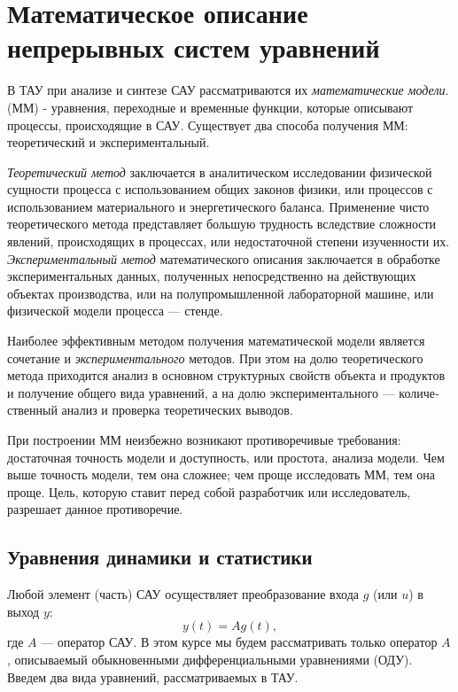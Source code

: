 \documentclass[TAU.tex]{subfiles}
\begin{document}
\chapter{Математическое описание непрерывных систем уравнений} %

В ТАУ при анализе и синтезе САУ рассматриваются их {\it математические модели}.
 (ММ) - уравнения, переходные и временные функции, которые описывают процессы, происходящие в САУ.
Существует два способа получения ММ: теоретический и экспериментальный.\par
{\it Теоретический метод} заключается в аналитическом исследовании физической сущности процесса с использованием общих законов физики, или процессов с использованием материального и энергетического баланса. Применение чисто теоретического метода представляет большую трудность вследствие сложности явлений, происходящих в процессах, или недостаточной степени изученности их.
{\it Экспериментальный метод} математического описания заклю­чается в обработке экспериментальных данных, полученных непо­средственно на действующих объектах производства, или на полу­промышленной лабораторной машине, или физической модели про­цесса — стенде.\par
Наиболее эффективным методом получения математической модели является сочетание {} и {\it экспериментального} ме­тодов. При этом на долю теоретического метода приходится анализ в основном структурных свойств объекта и продуктов и получение общего вида уравнений, а на долю экспериментального — количе­ственный анализ и проверка теоретических выводов.\par
При построении ММ неизбежно возникают противоречивые требования: достаточная точность модели и доступность, или простота, анализа модели. Чем выше точность модели, тем она сложнее; чем проще исследовать ММ, тем она проще. Цель, которую ставит перед собой разработчик или исследователь, разрешает данное противоречие. 




\section{Уравнения динамики и статистики} %

Любой элемент (часть) САУ осуществляет преобразование входа $g$ (или $u$) в выход $y$:
$$
y(t) = A g(t),
$$
где $A$ --- оператор САУ. В этом курсе мы будем рассматривать только оператор $A$, описываемый обыкновенными дифференциальными уравнениями (ОДУ). Введем два вида уравнений, рассматриваемых в ТАУ.
\end{document}
